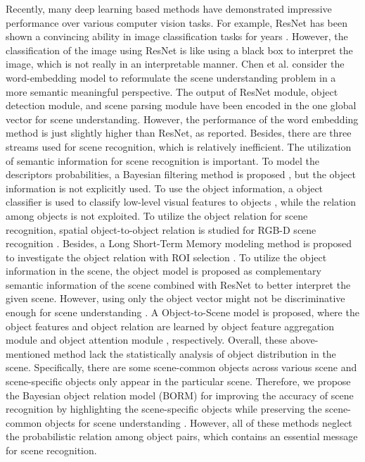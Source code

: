 \documentclass[letterpaper, 10 pt, conference]{ieeeconf}  %
\begin{document}
Recently, many deep learning based methods have demonstrated impressive performance over various computer vision tasks. For example, ResNet has been shown a convincing ability in image classification tasks for years \cite{He2016}. However, the classification of the image using ResNet is like using a black box to interpret the image, which is not really in an interpretable manner.  Chen et al. \cite{chen2019scene} consider the word-embedding model to reformulate the scene understanding problem in a more semantic meaningful perspective. The output of ResNet module, object detection module, and scene parsing module have been encoded in the one global vector for scene understanding. However, the performance of the word embedding method is just slightly higher than ResNet, as reported. Besides, there are three streams used for scene recognition, which is relatively inefficient.
The utilization of semantic information for scene recognition is important. To model the descriptors probabilities, a Bayesian filtering method is proposed \cite{wu2009visual}, but the object information is not explicitly used. To use the object information, a object classifier is used to classify low-level visual features to objects \cite{espinace2010indoor}, while the relation among objects is not exploited. To utilize the object relation for scene recognition, spatial object-to-object relation is studied for RGB-D scene recognition \cite{song2019image}. Besides, a Long Short-Term Memory modeling method is proposed to investigate the object relation with ROI selection \cite{laranjeira2019modeling}. To utilize the object information in the scene, the object model \cite{pal2019deduce} is proposed as complementary semantic information of the scene combined with ResNet to better interpret the given scene. However, using only the object vector might not be discriminative enough for scene understanding \cite{zeng2019learning}. A Object-to-Scene model is proposed, where the object features and object relation are learned by object feature aggregation module and object attention module \cite{Miao2021ots}, respectively. Overall, these above-mentioned method lack the statistically analysis of object distribution in the scene. Specifically, there are some scene-common objects across various scene and scene-specific objects only appear in the particular scene. Therefore, we propose the Bayesian object relation model (BORM) for improving the accuracy of scene recognition by highlighting the scene-specific objects while preserving the scene-common objects for scene understanding \cite{cheng2018scene}. However, all of these methods neglect the probabilistic relation among object pairs, which contains an essential message for scene recognition.
\end{document}
